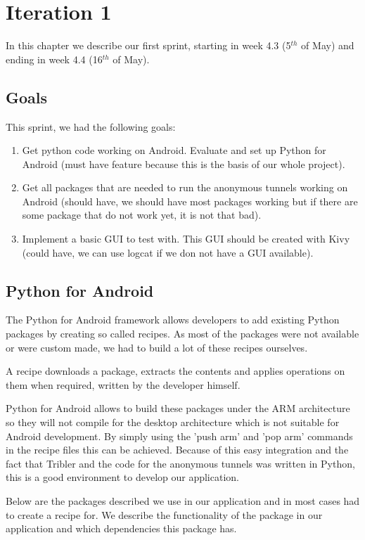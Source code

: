 \chapter{Iteration 1}
\label{iteration1}
	In this chapter we describe our first sprint, starting in week 4.3 (5$^{th}$ of May) and ending in week 4.4 (16$^{th}$ of May).

	\section{Goals}
		This sprint, we had the following goals:
	
		\begin{enumerate}
			\item Get python code working on Android. Evaluate and set up Python for Android (must have feature because this is the basis of our whole project).
			\item Get all packages that are needed to run the anonymous tunnels working on Android (should have, we should have most packages working but if there are some package that do not work yet, it is not that bad).
			\item Implement a basic GUI to test with. This GUI should be created with Kivy (could have, we can use logcat if we don not have a GUI available).
		\end{enumerate}
	
	\section{Python for Android}
		The Python for Android framework allows developers to add existing Python packages by creating so called recipes. As most of the packages were not available or were custom made, we had to build a lot of these recipes ourselves.
	
		A recipe downloads a package, extracts the contents and applies operations on them when required, written by the developer himself.
	
		Python for Android allows to build these packages under the ARM architecture so they will not compile for the desktop architecture which is not suitable for Android development. By simply using the 'push arm' and 'pop arm' commands in the recipe files this can be achieved. Because of this easy integration and the fact that Tribler and the code for the anonymous tunnels was written in Python, this is a good environment to develop our application.
	
		Below are the packages described we use in our application and in most cases had to create a recipe for. We describe the functionality of the package in our application and which dependencies this package has.
	
